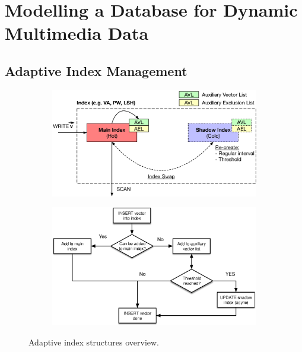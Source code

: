 \chapter{Modelling a Database for Dynamic Multimedia Data}
\label{chapter:system_model}

\section{Adaptive Index Management}

\begin{figure}[h!]
    \centering
    \begin{subfigure}[b]{0.40\textwidth}
        \centering
        \includegraphics[width=\textwidth]{figures/adaptive_index.eps}
        \label{fig:adaptive_index:architecture}
    \end{subfigure}
    \hfill
    \begin{subfigure}[b]{0.40\textwidth}
        \centering
        \includegraphics[width=\textwidth]{figures/adaptive_index_flow.eps}
        \label{fig:adaptive_index:flow}
    \end{subfigure}
    \caption{Adaptive index structures overview.}
    \label{fig:adaptive_index}
\end{figure}

